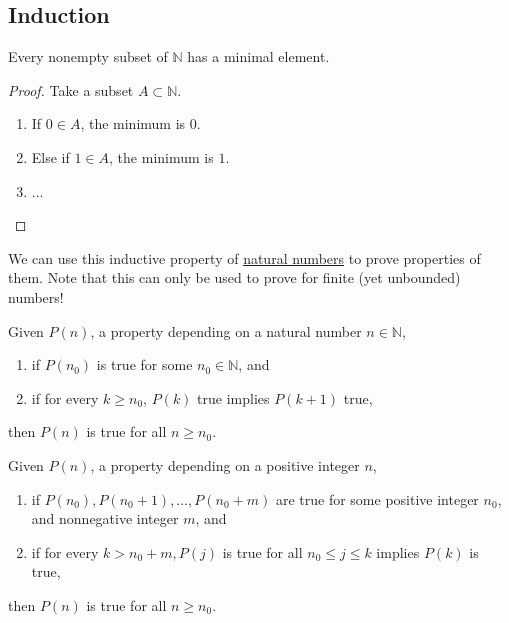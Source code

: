 \subsection{Induction}

  \begin{lemma}
    \label{thm:well-ordering-principle}
    Every nonempty subset of $\mathbb{N}$ has a minimal element. 
  \end{lemma} 
  \begin{proof}
    Take a subset $A \subset \mathbb{N}$. 
    \begin{enumerate}
      \item If $0 \in A$, the minimum is $0$. 
      \item Else if $1 \in A$, the minimum is $1$. 
      \item ...
    \end{enumerate} 
  \end{proof}

  We can use this inductive property of \hyperref[def:naturals]{natural numbers} to prove properties of them. Note that this can only be used to prove for finite (yet unbounded) numbers! 

  \begin{lemma}
    \label{thm:induction-principle}
    Given $P(n)$, a property depending on a natural number $n \in \mathbb{N}$, 
    \begin{enumerate}
      \item if $P(n_0)$ is true for some $n_0 \in \mathbb{N}$, and
      \item if for every $k \geq n_0$, $P(k)$ true implies $P(k+1)$ true, 
    \end{enumerate}
    then $P(n)$ is true for all $n \geq n_0$. 
  \end{lemma}

  \begin{lemma}
    \label{thm:strong-induction-principle}
    Given $P(n)$, a property depending on a positive integer $n$, 
    \begin{enumerate}
      \item if $P(n_0), P(n_0 + 1), \ldots, P(n_0 + m)$ are true for some positive integer $n_0$, and nonnegative integer $m$, and 
      \item if for every $k > n_0 + m, P(j)$ is true for all $n_0 \leq j \leq k$ implies $P(k)$ is true, 
    \end{enumerate}
    then $P(n)$ is true for all $n \geq n_0$. 
  \end{lemma} 

